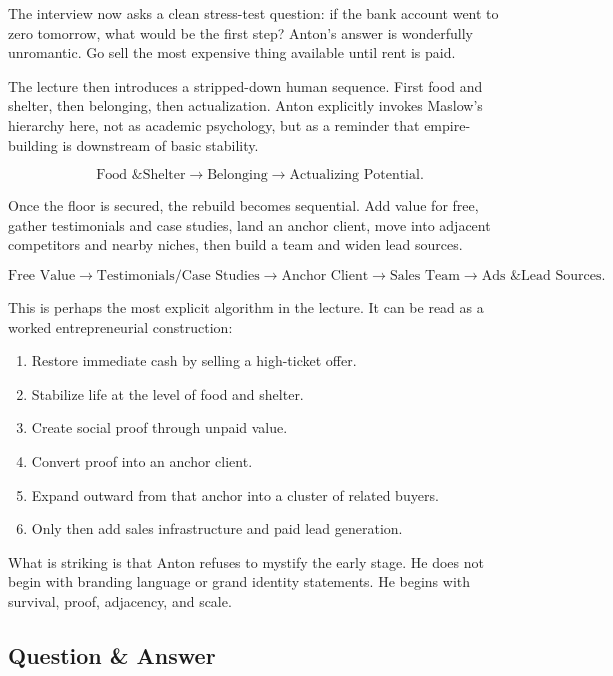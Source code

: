 The interview now asks a clean stress-test question: if the bank account went to zero tomorrow, what would be the first step? Anton's answer is wonderfully unromantic. Go sell the most expensive thing available until rent is paid.

The lecture then introduces a stripped-down human sequence. First food and shelter, then belonging, then actualization. Anton explicitly invokes Maslow's hierarchy here, not as academic psychology, but as a reminder that empire-building is downstream of basic stability.

\begin{equation}
\text{Food \& Shelter} \to \text{Belonging} \to \text{Actualizing Potential}.
\end{equation}

Once the floor is secured, the rebuild becomes sequential. Add value for free, gather testimonials and case studies, land an anchor client, move into adjacent competitors and nearby niches, then build a team and widen lead sources.

\begin{equation}
\text{Free Value} \to \text{Testimonials/Case Studies} \to \text{Anchor Client} \to \text{Sales Team} \to \text{Ads \& Lead Sources}.
\end{equation}

This is perhaps the most explicit algorithm in the lecture. It can be read as a worked entrepreneurial construction:

\begin{enumerate}
\item Restore immediate cash by selling a high-ticket offer.
\item Stabilize life at the level of food and shelter.
\item Create social proof through unpaid value.
\item Convert proof into an anchor client.
\item Expand outward from that anchor into a cluster of related buyers.
\item Only then add sales infrastructure and paid lead generation.
\end{enumerate}

What is striking is that Anton refuses to mystify the early stage. He does not begin with branding language or grand identity statements. He begins with survival, proof, adjacency, and scale.

\subsection{Question \& Answer}


